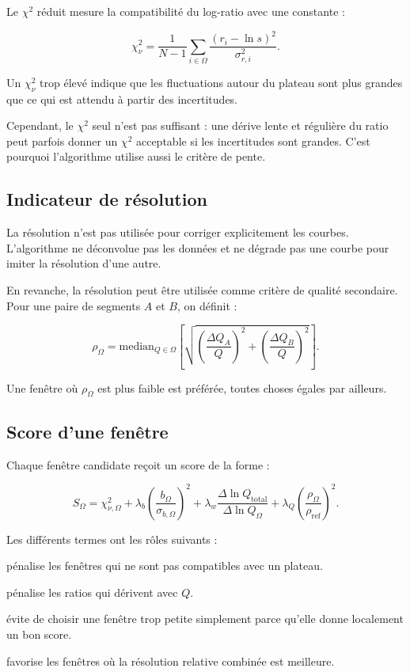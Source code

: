 \documentclass[11pt,a4paper]{article}
\begin{document}
Le $\chi^2$ réduit mesure la compatibilité du log-ratio avec une constante :

\[
    \chi^2_\nu
    =
    \frac{1}{N-1}
    \sum_{i\in\Omega}
    \frac{(r_i-\ln s)^2}{\sigma_{r,i}^2}.
\]

Un $\chi^2_\nu$ trop élevé indique que les fluctuations autour du plateau sont
plus grandes que ce qui est attendu à partir des incertitudes.

Cependant, le $\chi^2$ seul n'est pas suffisant : une dérive lente et régulière
du ratio peut parfois donner un $\chi^2$ acceptable si les incertitudes sont
grandes. C'est pourquoi l'algorithme utilise aussi le critère de pente.

\subsection{Indicateur de résolution}

La résolution n'est pas utilisée pour corriger explicitement les courbes.
L'algorithme ne déconvolue pas les données et ne dégrade pas une courbe pour
imiter la résolution d'une autre.

En revanche, la résolution peut être utilisée comme critère de qualité
secondaire. Pour une paire de segments $A$ et $B$, on définit :

\[
    \rho_\Omega
    =
    \mathrm{median}_{Q\in\Omega}
    \left[
        \sqrt{
            \left(\frac{\Delta Q_A}{Q}\right)^2
            +
            \left(\frac{\Delta Q_B}{Q}\right)^2
        }
    \right].
\]

Une fenêtre où $\rho_\Omega$ est plus faible est préférée, toutes choses égales
par ailleurs.

\subsection{Score d'une fenêtre}

Chaque fenêtre candidate reçoit un score de la forme :

\[
    S_\Omega =
    \chi^2_{\nu,\Omega}
    +
    \lambda_b
    \left(\frac{b_\Omega}{\sigma_{b,\Omega}}\right)^2
    +
    \lambda_w
    \frac{\Delta\ln Q_{\mathrm{total}}}
         {\Delta\ln Q_\Omega}
    +
    \lambda_Q
    \left(\frac{\rho_\Omega}{\rho_{\mathrm{ref}}}\right)^2.
\]

Les différents termes ont les rôles suivants :

\begin{description}[leftmargin=2em]
    \item[$\chi^2_\nu$] pénalise les fenêtres qui ne sont pas compatibles avec
    un plateau.
    \item[Terme de pente] pénalise les ratios qui dérivent avec $Q$.
    \item[Terme de largeur] évite de choisir une fenêtre trop petite simplement
    parce qu'elle donne localement un bon score.
    \item[Terme de résolution] favorise les fenêtres où la résolution relative
    combinée est meilleure.
\end{description}
\end{document}
